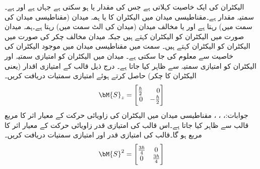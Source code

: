 الیکٹران کی ایک خاصیت   کہلاتی ہے جس کی مقدار   یا  ہو سکتی ہے  جہاں  ہے اور    ہے۔ سمتیہ مقدار ہے۔مقناطیسی میدان میں الیکٹران کا   یا ہمہ میدان (مقناطیسی میدان کی سمت میں) رہتا ہے اور یا مخالف میدان (میدان کی الٹ سمت میں) رہتا ہے۔ہمہ میدان صورت میں الیکٹران کو  الیکٹران کہتے ہیں جبکہ میدان مخالف چکر کی صورت میں  الیکٹران کو  الیکٹران کہتے ہیں۔ سمت میں مقناطیسی میدان میں موجود الیکٹران کی خاصیت   سے معلوم کی جا سکتی ہے۔ میدان میں  الیکٹران کو امتیازی سمتیہ  اور  الیکٹران کو امتیازی سمتیہ  سے ظاہر کیا جاتا ہے۔ درج ذیل  قالب کے امتیازی اقدار (یعنی الیکٹران کا چکر) حاصل کرتے ہوئے امتیازی سمتیات دریافت کریں۔
 \begin{align*}
\bM{S}_z=\begin{bmatrix*}[r] \frac{\hbar}{2} & 0\\ 0 & -\frac{\hbar}{2}\end{bmatrix*}
\end{align*}
جوابات:، ، ،  
مقناطیسی میدان میں الیکٹران کی زاویائی حرکت کے معیار اثر کا مربع  قالب سے ظاہر کیا جاتا ہے۔اس قالب کی امتیازی قدر زاویائی حرکت کے معیار اثر کا مربع ہو گا۔قالب کی امتیازی قدر اور امتیازی سمتیات دریافت کریں۔
  \begin{align*}
\bM{S}^2=\begin{bmatrix*}\frac{3\hbar}{4} & 0\\ 0 & \frac{3\hbar}{4}\end{bmatrix*}
\end{align*}
